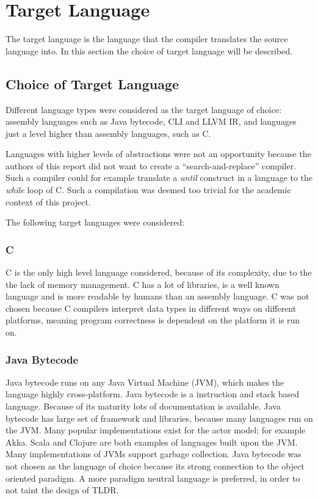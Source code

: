 
\section{Target Language}
\label{sec:targetLanguage}

The target language is the language that the compiler translates the source language into. In this section the choice of target language will be described.

\subsection{Choice of Target Language}

Different language types were considered as the target language of choice: assembly languages such as Java bytecode, CLI and LLVM IR, and languages just a level higher than assembly languages, such as C.

Languages with higher levels of abstractions were not an opportunity because the authors of this report did not want to create a \enquote{search-and-replace} compiler. Such a compiler could for example translate a \emph{until} construct in a language to the \emph{while} loop of C. Such a compilation was deemed too trivial for the academic context of this project. 

The following target languages were considered:

\subsubsection{C}
C is the only high level language considered, because of its complexity, due to the the lack of memory management. C has a lot of libraries, is a well known language and is more readable by humans than an assembly language. C was not chosen because C compilers interpret data types in different ways on different platforms, meaning program correctness is dependent on the platform it is run on.

\subsubsection{Java Bytecode}
Java bytecode runs on any Java Virtual Machine (JVM), which makes the language highly cross-platform. Java bytecode is a instruction and stack based language. Because of its maturity lots of documentation is available. Java bytecode has large set of framework and libraries, because many languages run on the JVM. Many popular implementations exist for the actor model; for example Akka. Scala and Clojure are both examples of languages built upon the JVM. Many implementations of JVMs support garbage collection. Java bytecode was not chosen as the language of choice because its strong connection to the object oriented paradigm. A more paradigm neutral language is preferred, in order to not taint the design of TLDR.

